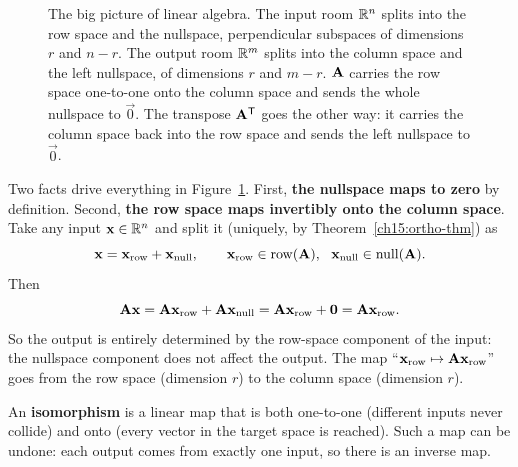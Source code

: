 \begin{figure}[htbp]
\caption{The big picture of linear algebra. The input room $\mathbb{R}^n$ splits into the row space and
the nullspace, perpendicular subspaces of dimensions $r$ and $n-r$. The output room $\mathbb{R}^m$
splits into the column space and the left nullspace, of dimensions $r$ and $m-r$. $\mathbf{A}$
carries the row space one-to-one onto the column space and sends the whole nullspace to
$\vec{0}$. The transpose $\mathbf{A}^{\mathsf{T}}$ goes the other way: it carries the column space back into
the row space and sends the left nullspace to $\vec{0}$.}
\label{ch15:bigpicture}
\end{figure}

Two facts drive everything in Figure~\ref{ch15:bigpicture}. First, \textbf{the nullspace maps to zero}
by definition. Second, \textbf{the row space maps invertibly onto the column space}. Take any input $\mathbf{x}\in\mathbb{R}^n$ and split it (uniquely, by
Theorem~\ref{ch15:ortho-thm}) as
\[
  \vec{x} = \vec{x}_{\text{row}} + \vec{x}_{\text{null}},
  \qquad \vec{x}_{\text{row}}\in\row(\mat{A}),\ \ \vec{x}_{\text{null}}\in\nullsp(\mat{A}).
\]
Then
\[
  \mathbf{A}\mathbf{x} = \mathbf{A}\mathbf{x}_{\text{row}} + \mathbf{A}\mathbf{x}_{\text{null}}
  = \mathbf{A}\mathbf{x}_{\text{row}} + \mathbf{0} = \mathbf{A}\mathbf{x}_{\text{row}}.
\]
So the output is entirely determined by the row-space component of the input: the nullspace
component does not affect the output. The map ``$\mathbf{x}_{\text{row}}\mapsto\mathbf{A}\mathbf{x}_{\text{row}}$''
goes from the row space (dimension $r$) to the column space (dimension $r$).

An \textbf{isomorphism} is a linear map that is both one-to-one (different inputs never collide)
and onto (every vector in the target space is reached). Such a map can be undone: each output
comes from exactly one input, so there is an inverse map.

